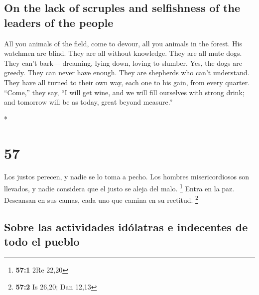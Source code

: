 \begin{paracol}{2}
\begin{otherlanguage}{english}
\hypertarget{on-the-lack-of-scruples-and-selfishness-of-the-leaders-of-the-people}{%
\subsection{On the lack of scruples and selfishness of the leaders of
the
people}\label{on-the-lack-of-scruples-and-selfishness-of-the-leaders-of-the-people}}

 All you animals of the field, come to devour, all you
animals in the forest.  His watchmen are blind. They are
all without knowledge. They are all mute dogs. They can't bark---
dreaming, lying down, loving to slumber.  Yes, the dogs
are greedy. They can never have enough. They are shepherds who can't
understand. They have all turned to their own way, each one to his gain,
from every quarter.  ``Come,'' they say, ``I will get
wine, and we will fill ourselves with strong drink; and tomorrow will be
as today, great beyond measure.''

\end{otherlanguage}

\switchcolumn[0]*

\hypertarget{section-112}{%
\section{57}\label{section-112}}

 Los justos perecen, y nadie se lo toma a pecho. Los
hombres misericordiosos son llevados, y nadie considera que el justo se
aleja del malo. \footnote{\textbf{57:1} 2Re 22,20}  Entra
en la paz. Descansan en sus camas, cada uno que camina en su rectitud.
\footnote{\textbf{57:2} Is 26,20; Dan 12,13}

\hypertarget{sobre-las-actividades-iduxf3latras-e-indecentes-de-todo-el-pueblo}{%
\subsection{Sobre las actividades idólatras e indecentes de todo el
pueblo}\label{sobre-las-actividades-iduxf3latras-e-indecentes-de-todo-el-pueblo}}


\end{paracol}
